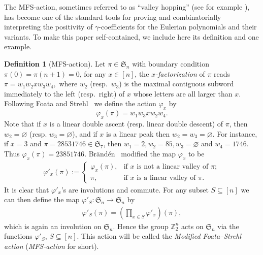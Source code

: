 \documentclass[12pt]{amsart}
\numberwithin{equation}{section}
\theoremstyle{plain}
\theoremstyle{definition}
\newtheorem{Def}[theorem]{Definition}
\newcommand{\Z}{\mathbb{Z}}
\def\SS{\mathfrak{S}}
\begin{document}
The MFS-action, sometimes referred to as ``valley hopping'' (see for example \cite[Sect.~4.1]{Ath}), has become one of the standard tools for proving and combinatorially interpreting the positivity of $\gamma$-coefficients for the Eulerian polynomials and their variants. To make this paper self-contained, we include here its definition and one example.

\begin{Def}[MFS-action]
Let $\pi\in\SS_n$ with boundary condition $\pi(0)=\pi(n+1)=0$,
 for  any  $x\in[n]$, the {\em$x$-factorization} of $\pi$ reads $\pi=w_1 w_2x w_3 w_4,$ where $w_2$ (resp.~$w_3$) is the maximal contiguous subword immediately to the left (resp.~right) of $x$ whose letters are all larger than $x$.  Following Foata and Strehl~\cite{FSt} we define the action $\varphi_x$ by
$$
\varphi_x(\pi)=w_1 w_3x w_2 w_4.
$$
Note that if $x$ is a linear double ascent (resp. linear double descent) of $\pi$, then $w_2=\varnothing$ (resp. $w_3=\varnothing$), and if $x$ is a linear peak then
$w_2=w_3=\varnothing$.
For instance, if $x=3$ and $\pi=28531746\in\SS_7$, then $w_1=2,w_2=85,w_3=\varnothing$ and $w_4=1746$.
Thus $\varphi_x(\pi)=23851746$. Br\"and\'en~\cite{Bra08} modified the map $\varphi_x$ to be
\begin{align*}
\varphi'_x(\pi):=
\begin{cases}
\varphi_x(\pi),&\text{if $x$ is not a linear valley of $\pi$};\\
\pi,& \text{if $x$ is a linear valley of $\pi$.}
\end{cases}
\end{align*}
It is clear that $\varphi'_x$'s are involutions and commute. For any subset $S\subseteq[n]$ we can then define the map $\varphi'_S :\SS_n\to \SS_n$ by
\begin{align*}
\varphi'_S(\pi)=\left(\prod_{x\in S}\varphi'_x\right)(\pi),
\end{align*}
which is again an involution on $\SS_n$. Hence the group $\Z_2^n$ acts on $\SS_n$ via the functions $\varphi'_S$, $S\subseteq[n]$. This action will be called  the {\em Modified Foata--Strehl action} ({\em MFS-action} for short).
\end{Def}
\end{document}
